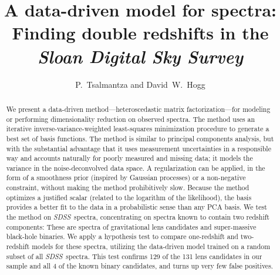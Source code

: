 \documentclass[12pt,preprint]{aastex}
\newcommand{\project}[1]{\textsl{#1}}
\newcommand{\sdss}{\project{SDSS}}
\newcommand{\SDSS}{\sdss}
\begin{document}
\sloppy

\title{A data-driven model for spectra:\\
       Finding double redshifts in the \project{Sloan Digital Sky Survey}}
\author{P.~Tsalmantza and David~W.~Hogg}

\begin{abstract}
We present a data-driven method---heteroscedastic matrix
factorization---for modeling or performing dimensionality reduction on
observed spectra.  The method uses an iterative
inverse-variance-weighted least-squares minimization procedure to
generate a best set of basis functions.  The method is similar to
principal components analysis, but with the substantial advantage that
it uses measurement uncertainties in a responsible way and accounts
naturally for poorly measured and missing data; it models the variance
in the noise-deconvolved data space.  A regularization can be applied,
in the form of a smoothness prior (inspired by Gaussian processes) or
a non-negative constraint, without making the method prohibitively
slow.  Because the method optimizes a justified scalar (related to the
logarithm of the likelihood), the basis provides a better fit to the
data in a probabilistic sense than any PCA basis.  We test the method
on \SDSS\ spectra, concentrating on spectra known to contain two
redshift components: These are spectra of gravitational lens
candidates and super-massive black-hole binaries. We apply a
hypothesis test to compare one-redshift and two-redshift models for
these spectra, utilizing the data-driven model trained on a random
subset of all \SDSS\ spectra.  This test confirms 129 of the 131 lens
candidates in our sample and all 4 of the known binary candidates, and
turns up very few false positives.
\end{abstract}

\end{document}
